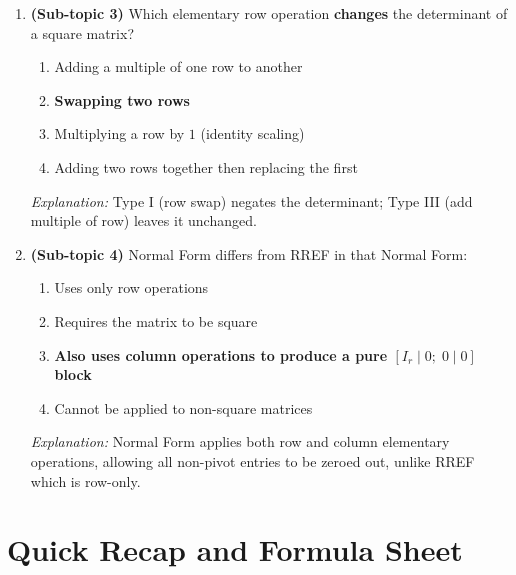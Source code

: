 \documentclass[12pt,a4paper]{article}
\begin{document}
\begin{enumerate}[label=\textbf{MCQ\arabic*.}]
  \item \textbf{(Sub-topic 3)} Which elementary row operation \textbf{changes} the determinant of a square matrix?
    \begin{enumerate}[label=(\alph*)]
      \item Adding a multiple of one row to another
      \item \textbf{Swapping two rows}
      \item Multiplying a row by $1$ (identity scaling)
      \item Adding two rows together then replacing the first
    \end{enumerate}
    \emph{Explanation:} Type I (row swap) negates the determinant; Type III (add multiple of row) leaves it unchanged.

  \item \textbf{(Sub-topic 4)} Normal Form differs from RREF in that Normal Form:
    \begin{enumerate}[label=(\alph*)]
      \item Uses only row operations
      \item Requires the matrix to be square
      \item \textbf{Also uses column operations to produce a pure $[I_r \mid 0;\; 0\mid 0]$ block}
      \item Cannot be applied to non-square matrices
    \end{enumerate}
    \emph{Explanation:} Normal Form applies both row and column elementary operations, allowing all non-pivot entries to be zeroed out, unlike RREF which is row-only.

\end{enumerate}

\section{Quick Recap and Formula Sheet}
\end{document}
